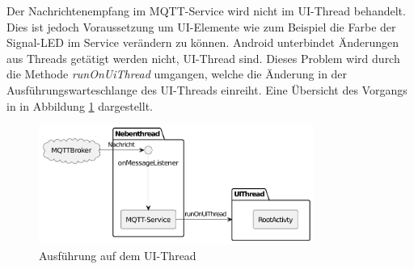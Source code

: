 \documentclass[11pt,a4paper]{report}
\begin{document}
Der Nachrichtenempfang im MQTT-Service wird nicht im UI-Thread behandelt.
Dies ist jedoch Voraussetzung um UI-Elemente wie zum Beispiel die Farbe der Signal-LED im Service verändern zu können.
Android unterbindet Änderungen aus Threads getätigt werden nicht, UI-Thread sind.
Dieses Problem wird durch die Methode \textit{runOnUiThread} umgangen, welche die Änderung in der Ausführungswarteschlange des UI-Threads einreiht.
Eine Übersicht des Vorgangs in in Abbildung \ref{fig:runOnUiThread} dargestellt.
\begin{figure}[htbp]
  \centering
  \includegraphics[width=0.8\textwidth]{images/runOnUiThread.pdf}
  \caption{Ausführung auf dem UI-Thread}
  \label{fig:runOnUiThread}
\end{figure}
\end{document}
